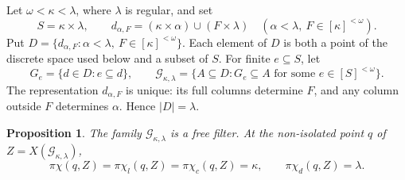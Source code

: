 \documentclass[11pt,a4paper]{amsart}
\newtheorem{proposition}[theorem]{Proposition}
\theoremstyle{definition}
\theoremstyle{remark}
\newcommand{\G}{\mathcal G}
\newcommand{\pc}{\pi\chi}
\newcommand{\pcl}{\pi\chi_l}
\newcommand{\pcc}{\pi\chi_c}
\newcommand{\pcd}{\pi\chi_d}
\begin{document}
Let $\omega<\kappa<\lambda$, where $\lambda$ is regular, and set
\[
S=\kappa\times\lambda,\qquad
d_{\alpha,F}=(\kappa\times\alpha)\cup(F\times\lambda)
\quad(\alpha<\lambda,\ F\in[\kappa]^{<\omega}).
\]
Put $D=\{d_{\alpha,F}:\alpha<\lambda,\ F\in[\kappa]^{<\omega}\}$. Each element of $D$ is both a point of the discrete space used below and a subset of $S$. For finite $e\subseteq S$, let
\[
G_e=\{d\in D:e\subseteq d\},\qquad
\G_{\kappa,\lambda}=\{A\subseteq D:G_e\subseteq A
\text{ for some }e\in[S]^{<\omega}\}.
\]
The representation $d_{\alpha,F}$ is unique: its full columns determine $F$, and any column outside $F$ determines $\alpha$. Hence $|D|=\lambda$.

\begin{proposition}\label{prop:matrix}
The family $\G_{\kappa,\lambda}$ is a free filter. At the non-isolated point $q$ of $Z=X(\G_{\kappa,\lambda})$,
\[
\pc(q,Z)=\pcl(q,Z)=\pcc(q,Z)=\kappa,
\qquad \pcd(q,Z)=\lambda.
\]
\end{proposition}
\end{document}
